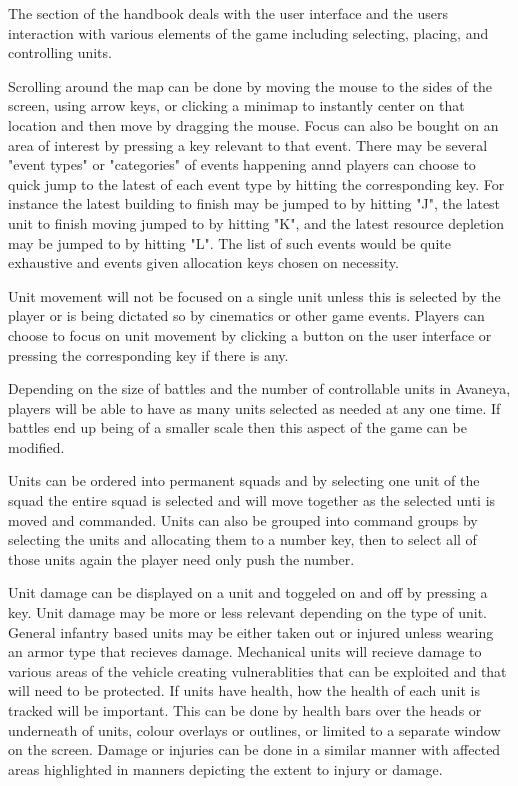 
The section of the handbook deals with the user interface and the users interaction with various elements of the game including selecting, placing, and controlling units.

Scrolling around the map can be done by moving the mouse to the sides of the screen, using arrow keys, or clicking a minimap to instantly center on that location and then move by dragging the mouse. Focus can also be bought on an area of interest by pressing a key relevant to that event. There may be several "event types" or "categories" of events happening annd players can choose to quick jump to the latest of each event type by hitting the corresponding key. For instance the latest building to finish may be jumped to by hitting "J", the latest unit to finish moving jumped to by hitting "K", and the latest resource depletion may be jumped to by hitting "L". The list of such events would be quite exhaustive and events given allocation keys chosen on necessity.

Unit movement will not be focused on a single unit unless this is selected by the player or is being dictated so by cinematics or other game events. Players can choose to focus on unit movement by clicking a button on the user interface or pressing the corresponding key if there is any.

Depending on the size of battles and the number of controllable units in Avaneya, players will be able to have as many units selected as needed at any one time. If battles end up being of a smaller scale then this aspect of the game can be modified.

Units can be ordered into permanent squads and by selecting one unit of the squad the entire squad is selected and will move together as the selected unti is moved and commanded. Units can also be grouped into command groups by selecting the units and allocating them to a number key, then to select all of those units again the player need only push the number.

Unit damage can be displayed on a unit and toggeled on and off by pressing a key. Unit damage may be more or less relevant depending on the type of unit. General infantry based units may be either taken out or injured unless wearing an armor type that recieves damage. Mechanical units will recieve damage to various areas of the vehicle creating vulnerablities that can be exploited and that will need to be protected. If units have health, how the health of each unit is tracked will be important. This can be done by health bars over the heads or underneath of units, colour overlays or outlines, or limited to a separate window on the screen. Damage or injuries can be done in a similar manner with affected areas highlighted in manners depicting the extent to injury or damage.




